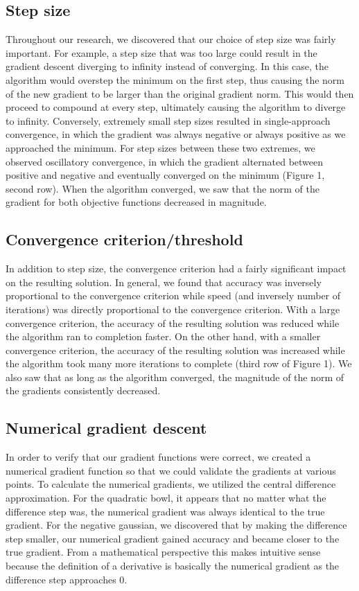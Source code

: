 \documentclass{article}
\begin{document}
\subsection{Step size}
Throughout our research, we discovered that our choice of step size was fairly important. For example, a step size that was too large could result in the gradient descent diverging to infinity instead of converging. In this case, the algorithm would overstep the minimum on the first step, thus causing the norm of the new gradient to be larger than the original gradient norm. This would then proceed to compound at every step, ultimately causing the algorithm to diverge to infinity. Conversely, extremely small step sizes resulted in single-approach convergence, in which the gradient was always negative or always positive as we approached the minimum. For step sizes between these two extremes, we observed oscillatory convergence, in which the gradient alternated between positive and negative and eventually converged on the minimum (Figure 1, second row). When the algorithm converged, we saw that the norm of the gradient for both objective functions decreased in magnitude.

\subsection{Convergence criterion/threshold}
In addition to step size, the convergence criterion had a fairly significant impact on the resulting solution. In general, we found that accuracy was inversely proportional to the convergence criterion while speed (and inversely number of iterations) was directly proportional to the convergence criterion. With a large convergence criterion, the accuracy of the resulting solution was reduced while the algorithm ran to completion faster. On the other hand, with a smaller convergence criterion, the accuracy of the resulting solution was increased while the algorithm took many more iterations to complete (third row of Figure 1). We also saw that as long as the algorithm converged, the magnitude of the norm of the gradients consistently decreased.

\subsection{Numerical gradient descent}
In order to verify that our gradient functions were correct, we created a numerical gradient function so that we could validate the gradients at various points. To calculate the numerical gradients, we utilized the central difference approximation. For the quadratic bowl, it appears that no matter what the difference step was, the numerical gradient was always identical to the true gradient. For the negative gaussian, we discovered that by making the difference step smaller, our numerical gradient gained accuracy and became closer to the true gradient. From a mathematical perspective this makes intuitive sense because the definition of a derivative is basically the numerical gradient as the difference step approaches 0.
\end{document}
